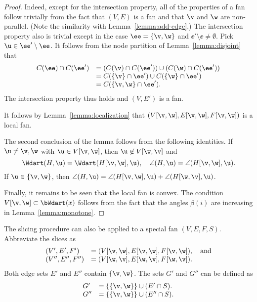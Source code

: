 \begin{proof} 
Indeed, except for the intersection property, all of the properties
of a fan follow trivially from the fact that $(V,E)$ is a fan and
that $\v$ and $\w$ are non-parallel.  (Note the similarity with
Lemma~\ref{lemma:add-edge}.)  The intersection property also is
trivial except in the case $\ee=\{\v,\w\}$ and $\ee'\setminus \ee\ne
\emptyset$.  Pick $\u\in \ee'\setminus\ee$.  It follows from the
node partition of Lemma~\ref{lemma:disjoint} that
\begin{displaymath}
\begin{array}{lll}
C(\ee) \cap C(\ee') &= (C(\v) \cap C(\ee')) \cup (C(\w)\cap C(\ee')) \\
&= C(\{\v\}\cap \ee') \cup C(\{\w\}\cap \ee') \\
&= C(\{\v,\w\}\cap \ee').
\end{array}
\end{displaymath}
The intersection property thus holds and $(V,E')$ is a fan.

It follows by Lemma~\ref{lemma:localization} that
$(V[\v,\w],E[\v,\w],F[\v,\w])$ is a local fan.

The second conclusion of the lemma follows from the following identities.
If $\u\ne \v,\w$ with $\u\in V[\v,\w]$, then $\u\not\in V[\w,\v]$ and 
\begin{equation}
\Wdart(H,\u)=\Wdart(H[\v,\w],\u),\quad \angle(H,\u) = \angle(H[\v,\w],\u).
\end{equation}
If $\u\in\{\v,\w\}$, then 
$\angle(H,\u)=\angle(H[\v,\w],\u) +\angle(H[\w,\v],\u)$.

Finally, it remains to be seen that the local fan is convex.
The condition $V[\v,\w]\subset \bWdart(x)$ follows from the
fact that the angles $\beta(i)$ are increasing in
Lemma~\ref{lemma:monotone}.
\end{proof}



The slicing procedure can also be applied to a special fan $(V,E,F,S)$.
Abbreviate the slices as
\begin{displaymath}
\begin{array}{lll}
(V',E',F')&=(V[\v,\w],E[\v,\w],F[\v,\w]),\quad\text{and}\\
(V'',E'',F'')&= (V[\w,\v],E[\w,\v],F[\w,\v]).
\end{array}
\end{displaymath}
Both edge sets $E'$ and $E''$ contain $\{\v,\w\}$.  The sets $G'$ and
$G''$ can be defined as
\begin{displaymath}
\begin{array}{lll}
G' &= \{\{\v,\w\}\} \cup (E'\cap S).\\
G'' &= \{\{\v,\w\}\} \cup (E''\cap S).\\
\end{array}
\end{displaymath} 

